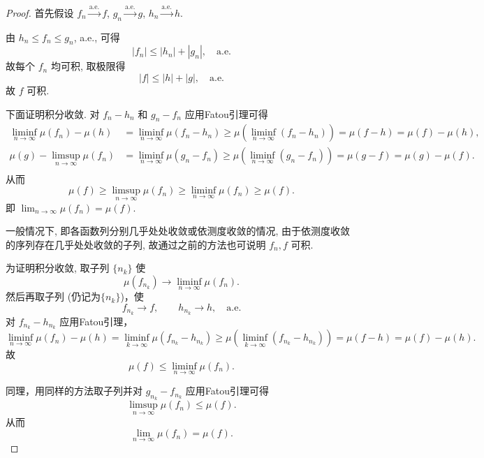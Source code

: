         \begin{proof}
            首先假设 $f_n\stackrel{\text{a.e.}}{\longrightarrow}f$, 
            $g_n\stackrel{\text{a.e.}}{\longrightarrow}g$, 
            $h_n\stackrel{\text{a.e.}}{\longrightarrow}h$.

            由 $h_n\leqslant f_n\leqslant g_n$, a.e., 可得
            \[
                |f_n|\leqslant |h_n|+|g_n|,\quad \text{a.e.}
            \]
            故每个 $f_n$ 均可积, 
            取极限得
            \[
                |f|\leqslant |h|+|g|,\quad \text{a.e.}
            \]
            故 $f$ 可积.

            下面证明积分收敛. 
            对 $f_n-h_n$ 和 $g_n-f_n$ 应用Fatou引理可得
            \[
                \begin{aligned}
                    \liminf_{n\to\infty}\mu(f_n)-\mu(h)&=\liminf_{n\to\infty} \mu(f_n-h_n)\geqslant \mu(\liminf_{n\to\infty}(f_n-h_n))=\mu(f-h)=\mu(f)-\mu(h),\\
                    \mu(g)-\limsup_{n\to\infty}\mu(f_n)&=\liminf_{n\to\infty} \mu(g_n-f_n)\geqslant \mu(\liminf_{n\to\infty}(g_n-f_n))=\mu(g-f)=\mu(g)-\mu(f).\\
                \end{aligned}
            \]
            从而
            \[
                \mu(f)\geqslant \limsup_{n\to\infty}\mu(f_n)\geqslant \liminf_{n\to\infty}\mu(f_n)\geqslant \mu(f).
            \]
            即 $\displaystyle\lim_{n\to\infty}\mu(f_n)=\mu(f)$.
            
            一般情况下, 即各函数列分别几乎处处收敛或依测度收敛的情况, 由于依测度收敛的序列存在几乎处处收敛的子列, 故通过之前的方法也可说明 $f_n,f$ 可积. 
            
            为证明积分收敛, 取子列 $\{n_k\}$ 使
            \[
                \mu(f_{n_k})\to\liminf_{n\to\infty}\mu(f_n).
            \]
            然后再取子列 (仍记为$\{n_k\}$)，使
            \[
                f_{n_k}\to f,\qquad
                h_{n_k}\to h,
                \quad \text{a.e.}
            \]
            对 $f_{n_k}-h_{n_k}$ 应用Fatou引理，
            \[
                \liminf_{n\to\infty}\mu(f_n)-\mu(h)=\liminf_{k\to\infty}\mu(f_{n_k}-h_{n_k})\geqslant \mu(\liminf_{k\to\infty}(f_{n_k}-h_{n_k}))=\mu(f-h)=\mu(f)-\mu(h).
            \]
            故
            \[
                \mu(f)\leqslant\liminf_{n\to\infty}\mu(f_n).
            \]

            同理，用同样的方法取子列并对 $g_{n_k}-f_{n_k}$ 应用Fatou引理可得
            \[
                \limsup_{n\to\infty}\mu(f_n)\leqslant\mu(f).
            \]
            从而
            \[
                \lim_{n\to\infty}\mu(f_n)=\mu(f).
            \]
        \end{proof}
